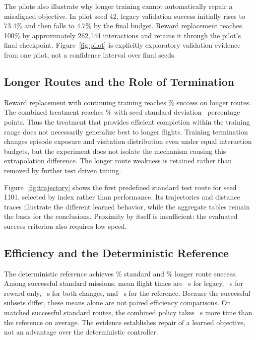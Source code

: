 \documentclass[conference]{IEEEtran}
\begin{document}
The pilots also illustrate why longer training cannot automatically repair a
misaligned objective. In pilot seed 42, legacy validation success initially
rises to 73.4\% and then falls to 4.7\% by the final budget. Reward replacement
reaches 100\% by approximately 262,144 interactions and retains it through
the pilot's final checkpoint. Figure~\ref{fig:pilot} is explicitly exploratory
validation evidence from one pilot, not a confidence interval over final seeds.



\subsection{Longer Routes and the Role of Termination}
Reward replacement with continuing training reaches \RewardOnlyLongSuccess\%
success on longer routes. The combined treatment reaches
\FixedLongSuccess\% with seed standard deviation \FixedLongSD\ percentage
points. Thus the treatment that provides efficient completion within the
training range does not necessarily generalize best to longer flights.
Training termination changes episode exposure and visitation distribution even
under equal interaction budgets, but the experiment does not isolate the
mechanism causing this extrapolation difference. The longer route weakness is
retained rather than removed by further test driven tuning.

Figure~\ref{fig:trajectory} shows the first predefined standard test route for
seed 1101, selected by index rather than performance. Its trajectories and
distance traces illustrate the different learned behavior, while the aggregate
tables remain the basis for the conclusions. Proximity by itself is insufficient:
the evaluated success criterion also requires low speed.



\subsection{Efficiency and the Deterministic Reference}
The deterministic reference achieves \PDSuccess\% standard and
\PDLongSuccess\% longer route success. Among successful standard missions,
mean flight times are \LegacyTime\ s for legacy, \RewardOnlyTime\ s for
reward only, \FixedTime\ s for both changes, and \PDTime\ s for the reference.
Because the successful subsets differ, these means alone are not paired
efficiency comparisons. On matched successful standard routes, the combined
policy takes \FixedMinusPDTime\ s more time than the reference on average.
The evidence establishes repair of a learned objective, not an advantage over
the deterministic controller.
\end{document}
